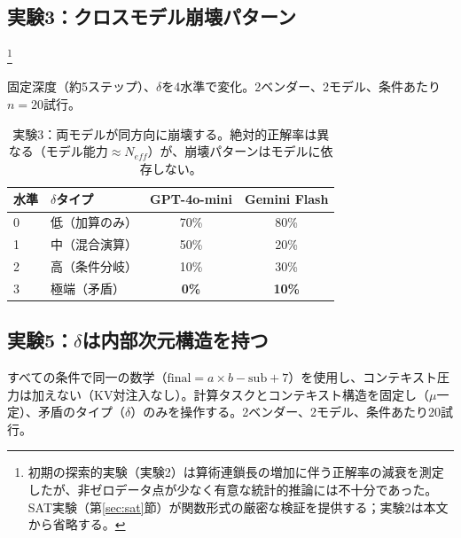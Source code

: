 \documentclass[11pt,a4paper]{article}
\begin{document}
\subsection{実験3：クロスモデル崩壊パターン}\footnote{初期の探索的実験（実験2）は算術連鎖長の増加に伴う正解率の減衰を測定したが、非ゼロデータ点が少なく有意な統計的推論には不十分であった。SAT実験（第\ref{sec:sat}節）が関数形式の厳密な検証を提供する；実験2は本文から省略する。}

固定深度（約5ステップ）、$\delta$を4水準で変化。2ベンダー、2モデル、条件あたり$n = 20$試行。

\begin{table}[htbp]
\centering
\begin{tabular}{llcc}
\toprule
\textbf{水準} & \textbf{$\delta$タイプ} & \textbf{GPT-4o-mini} & \textbf{Gemini Flash} \\
\midrule
0 & 低（加算のみ） & 70\% & 80\% \\
1 & 中（混合演算） & 50\% & 20\% \\
2 & 高（条件分岐） & 10\% & 30\% \\
3 & 極端（矛盾） & \textbf{0\%} & \textbf{10\%} \\
\bottomrule
\end{tabular}
\caption{実験3：両モデルが同方向に崩壊する。絶対的正解率は異なる（モデル能力$\approx N_{eff}$）が、崩壊パターンはモデルに依存しない。}
\label{tab:exp3}
\end{table}

\subsection{実験5：\texorpdfstring{$\delta$}{δ}は内部次元構造を持つ}
\label{sec:llm-delta-structure}

すべての条件で同一の数学（$\text{final} = a \times b - \text{sub} + 7$）を使用し、コンテキスト圧力は加えない（KV対注入なし）。計算タスクとコンテキスト構造を固定し（$\mu$一定）、矛盾のタイプ（$\delta$）のみを操作する。2ベンダー、2モデル、条件あたり20試行。
\end{document}
